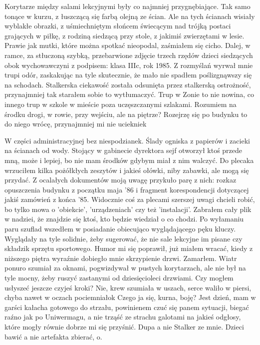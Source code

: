 \documentclass[../MAIN.tex]{subfiles}
\begin{document}
Korytarze między salami lekcyjnymi były co najmniej przygnębiające. Tak samo tonące w kurzu, z łuszczącą się farbą olejną ze ścian. Ale na tych ścianach wisiały wyblakłe obrazki, z uśmiechniętym słońcem świecącym nad trójką postaci grających w piłkę, z rodziną siedzącą przy stole, z jakimiś zwierzętami w lesie. Prawie jak mutki, które można spotkać nieopodal, zaśmiałem się cicho. Dalej, w ramce, za stłuczoną szybką, przebarwione zdjęcie trzech rzędów dzieci siedzących obok wychowawczyni z podpisem: klasa IIIc, rok 1985. Z rozmyślań wyrwał mnie trupi odór, zaskakując na tyle skutecznie, że mało nie spadłem poślizgnąwszy się na schodach. Stalkerska ciekawość została odsunięta przez stalkerską ostrożność, przynajmniej tak starałem sobie to wytłumaczyć. Trup w Zonie to nie nowina, co innego trup w szkole w mieście poza uczęszczanymi szlakami. Rozumiem na środku drogi, w rowie, przy wejściu, ale na piętrze? Rozejrzę się po budynku to do niego wrócę, przynajmniej mi nie ucieknie\3k

W części administracyjnej bez niespodzianek. Ślady ogniska z papierów i zacieki na ścianach od wody. Stojący w gabinecie dyrektora sejf otworzył ktoś przede mną, może i lepiej, bo nie mam środków gdybym miał z nim walczyć. Do plecaka wrzuciłem kilka pożółkłych zeszytów i jakieś ołówki, niby zabawki, ale mogą się przydać. Z ocalałych dokumentów moją uwagę przykuło parę z nich: rozkaz opuszczenia budynku z początku maja '86 i fragment korespondencji dotyczącej jakiś zamówień z końca '85. Widocznie coś za plecami szerszej uwagi chcieli robić, bo tylko mowa o 'obiekcie', 'urządzeniach' czy też 'instalacji'. Zabrałem cały plik w nadziei, że znajdzie się ktoś, kto będzie wiedział o co chodzi. Po wyłamaniu paru szuflad wszedłem w posiadanie obiecująco wyglądającego pęku kluczy. Wyglądały na tyle solidnie, żeby sugerować, że nie sale lekcyjne im pisane czy składzik sprzętu sportowego. Humor mi się poprawił, już miałem wracać, kiedy z niższego piętra wyraźnie dobiegło mnie skrzypienie drzwi. Zamarłem. Wiatr ponuro 
szumiał za oknami, pogwizdywał w pustych korytarzach, ale nie był na tyle mocny, żeby ruszyć zastanymi od dziesięcioleci drzwiami. Czy mogłem usłyszeć jeszcze czyjeś kroki? Nie, krew szumiała w uszach, serce waliło w piersi, chyba nawet w oczach pociemniało\3k Czego ja się, kurna, boję? Jest dzień, mam w garści kałacha gotowego do strzału, powinienem czuć się panem sytuacji, biegać raźno jak po Uniwermagu, a nie trząść ze strachu galotami na jakieś odgłosy, które mogły równie dobrze mi się przyśnić. Dupa a nie Stalker ze mnie. Dzieci bawić a nie artefakta zbierać, o.
\end{document}
